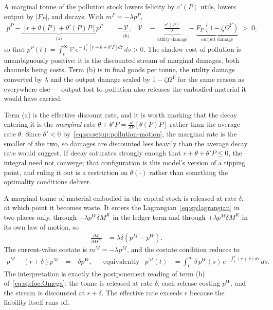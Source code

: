  A marginal tonne of the pollution stock lowers felicity by $v'\left(P\right)$ utils, lowers output by $\left|F_P\right|$, and decays. With $m^P=-\lambda p^P$,
\begin{align}
\dot p^P-\underbrace{\left[r+\theta\left(P\right)+\theta'\left(P\right)P\right]}_{\text{(a)}}p^P &= -\underbrace{\mathcal V}_{\text{(b)}},
&
\mathcal V &\equiv \underbrace{\frac{v'\left(P\right)}{\lambda}}_{\text{utility damage}}-\underbrace{F_P\left(1-\zeta\Omega^Y\right)}_{\text{output damage}}\;>\;0,
\label{eq:sp:costate:P}
\end{align}
so that $p^P(t)=\int_t^\infty\mathcal V\,e^{-\int_t^s\left[r+\theta+\theta'P\right]d\tau}\,ds>0$. The shadow cost of pollution is unambiguously positive: it is the discounted stream of marginal damages, both channels being costs. Term (b) is in final goods per tonne, the utility damage converted by $\lambda$ and the output damage scaled by $1-\zeta\Omega^Y$ for the same reason as everywhere else --- output lost to pollution also releases the embodied material it would have carried.

Term (a) is the effective discount rate, and it is worth marking that the decay entering it is the \emph{marginal} rate $\theta+\theta'P=\tfrac{d}{dP}\left[\theta\left(P\right)P\right]$ rather than the average rate $\theta$. Since $\theta'<0$ by~\eqref{eq:sp:setup:pollution-motion}, the marginal rate is the smaller of the two, so damages are discounted less heavily than the average decay rate would suggest. If decay saturates strongly enough that $r+\theta+\theta'P\le0$, the integral need not converge; that configuration is this model's version of a tipping point, and ruling it out is a restriction on $\theta\left(\cdot\right)$ rather than something the optimality conditions deliver.

 A marginal tonne of material embodied in the capital stock is released at rate $\delta$, at which point it becomes waste. It enters the Lagrangian~\eqref{eq:sp:lagrangian} in two places only, through $-\lambda p^W\delta M^K$ in the ledger term and through $+\lambda p^M\delta M^K$ in its own law of motion, so
\begin{align*}
\frac{\partial\mathcal L}{\partial M^K} &= \lambda\delta\left(p^M-p^W\right).
\end{align*}
The current-value costate is $m^M=-\lambda p^M$, and the costate condition reduces to
\begin{align}
\dot p^M-\left(r+\delta\right)p^M &= -\delta p^W,
&&\text{equivalently}
&
p^M(t) &= \int_t^\infty \delta\,p^W(s)\,e^{-\int_t^s\left(r+\delta\right)d\tau}\,ds .
\label{eq:sp:costate:M}
\end{align}
The interpretation is exactly the postponement reading of term (b) of~\eqref{eq:sp:foc:Omega}: the tonne is released at rate $\delta$, each release costing $p^W$, and the stream is discounted at $r+\delta$. The effective rate exceeds $r$ because the liability itself runs off.

